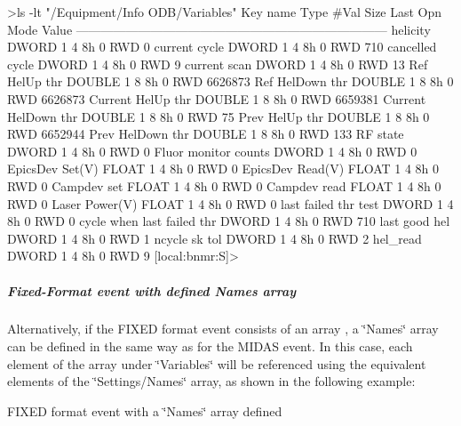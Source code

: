 \begin{DoxyCode}
>ls -lt "/Equipment/Info ODB/Variables"
Key name                        Type    #Val  Size  Last Opn Mode Value
---------------------------------------------------------------------------
helicity                        DWORD   1     4     8h   0   RWD  0
current cycle                   DWORD   1     4     8h   0   RWD  710
cancelled cycle                 DWORD   1     4     8h   0   RWD  9
current scan                    DWORD   1     4     8h   0   RWD  13
Ref HelUp thr                   DOUBLE  1     8     8h   0   RWD  6626873
Ref HelDown thr                 DOUBLE  1     8     8h   0   RWD  6626873
Current HelUp thr               DOUBLE  1     8     8h   0   RWD  6659381
Current HelDown thr             DOUBLE  1     8     8h   0   RWD  75
Prev HelUp thr                  DOUBLE  1     8     8h   0   RWD  6652944
Prev HelDown thr                DOUBLE  1     8     8h   0   RWD  133
RF state                        DWORD   1     4     8h   0   RWD  0
Fluor monitor counts            DWORD   1     4     8h   0   RWD  0
EpicsDev Set(V)                 FLOAT   1     4     8h   0   RWD  0
EpicsDev Read(V)                FLOAT   1     4     8h   0   RWD  0
Campdev set                     FLOAT   1     4     8h   0   RWD  0
Campdev read                    FLOAT   1     4     8h   0   RWD  0
Laser Power(V)                  FLOAT   1     4     8h   0   RWD  0
last failed thr test            DWORD   1     4     8h   0   RWD  0
cycle when last failed thr      DWORD   1     4     8h   0   RWD  710
last good hel                   DWORD   1     4     8h   0   RWD  1
ncycle sk tol                   DWORD   1     4     8h   0   RWD  2
hel_read                        DWORD   1     4     8h   0   RWD  9
[local:bnmr:S]>  
\end{DoxyCode}
\hypertarget{RC_mhttpd_Equipment_page_RC_mhttpd_Equipment_example7}{}\subparagraph{Fixed-\/Format event with defined Names array}\label{RC_mhttpd_Equipment_page_RC_mhttpd_Equipment_example7}
Alternatively, if the FIXED format event consists of an array , a \char`\"{}Names\char`\"{} array can be defined in the same way as for the MIDAS event. In this case, each element of the array under \char`\"{}Variables\char`\"{} will be referenced using the equivalent elements of the \char`\"{}Settings/Names\char`\"{} array, as shown in the following example: \par
\par
\par
 \begin{center}  FIXED format event with a \char`\"{}Names\char`\"{} array defined \par
\par
\par
  \end{center}  \par
\par
\par


